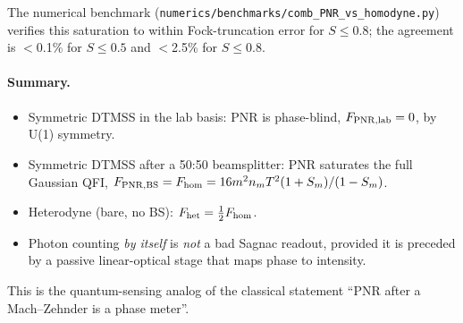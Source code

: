 \documentclass[11pt]{article}
\begin{document}
The numerical benchmark
(\texttt{numerics/benchmarks/comb\_PNR\_vs\_homodyne.py}) verifies
this saturation to within Fock-truncation error for $S\le 0.8$;
the agreement is $<$0.1\% for $S\le 0.5$ and $<$2.5\% for $S\le 0.8$.

\paragraph{Summary.}
\begin{itemize}\itemsep0em
\item Symmetric DTMSS in the lab basis: PNR is phase-blind,
  $F_{\rm PNR,lab}=0$, by U(1) symmetry.
\item Symmetric DTMSS after a 50:50 beamsplitter: PNR saturates the
  full Gaussian QFI, $F_{\rm PNR,BS} = F_{\rm hom} =
  16 m^2 n_m T^2 (1+S_m)/(1-S_m)$.
\item Heterodyne (bare, no BS): $F_{\rm het}=\tfrac12 F_{\rm hom}$.
\item Photon counting \emph{by itself} is \emph{not} a bad Sagnac
  readout, provided it is preceded by a passive linear-optical
  stage that maps phase to intensity.
\end{itemize}

This is the quantum-sensing analog of the classical statement
``PNR after a Mach--Zehnder is a phase meter''.
\end{document}
